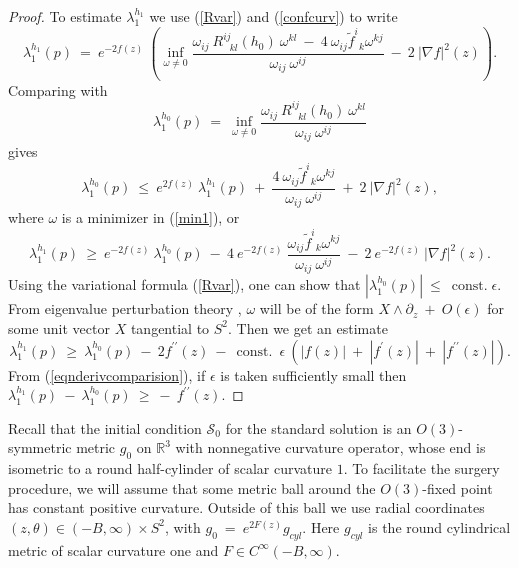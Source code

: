 \documentclass[12pt]{amsart}
\newcommand{\const}{\operatorname{const.}}
\newcommand{\R}{{\mathbb R}}
\newcommand{\s}{{\mathcal S}}
\numberwithin{equation}{section}
\theoremstyle{plain}
\theoremstyle{definition}
\theoremstyle{remark}
\begin{document}
\begin{proof}
To estimate $\lambda_1^{h_1}$ we use
(\ref{Rvar}) and (\ref{confcurv}) to write
\begin{equation} \label{min1}
\lambda_1^{h_1}(p) \: = \: e^{-2f(z)} \: \left(
\inf_{\omega \neq 0} \frac{\omega_{ij} \: R^{ij}_{\: \: \: kl}(h_0) \: \omega^{kl}
\: - \: 4 \: \omega_{ij} \widetilde{f}^i_{\: \: k} \omega^{kj}}{\omega_{ij} \: \omega^{ij}} \: - \: 2 \: |\nabla f|^2(z) \right).
\end{equation}
Comparing with
\begin{equation}
\lambda_1^{h_0}(p) \: = \: 
\inf_{\omega \neq 0} \frac{\omega_{ij} \: R^{ij}_{\: \: \: kl}(h_0) \: \omega^{kl}}{
\omega_{ij} \: \omega^{ij}}
\end{equation}
gives
\begin{equation}
\lambda_1^{h_0}(p) \: \le \: e^{2f(z)} \: \lambda_1^{h_1}(p) \: + \: 
\frac{4 \: \omega_{ij} \widetilde{f}^i_{\: \: k} \omega^{kj}}{\omega_{ij} \: \omega^{ij}} \: + \: 2 \: |\nabla f|^2(z),
\end{equation}
where $\omega$ is a minimizer in (\ref{min1}), or
\begin{equation}
\lambda_1^{h_1}(p) \: \ge \: e^{- 2f(z)} \: \lambda_1^{h_0}(p) \: - \:
4 \: e^{- 2f(z)} \: 
\frac{\omega_{ij} \widetilde{f}^i_{\: \: k} \omega^{kj}}{\omega_{ij} \: \omega^{ij}}
\: - \: 2 \: e^{- 2f(z)} \: |\nabla f|^2(z).
\end{equation}
Using the variational formula (\ref{Rvar}), one can show that
$|\lambda_1^{h_0}(p)| \: \le \: \const \epsilon$.
From eigenvalue perturbation theory
\cite[Chapter 12]{Reed-Simon},
$\omega$ will be of the
form $X \wedge \partial_z \: + \: O(\epsilon)$ for some unit vector $X$ tangential
to $S^2$. Then we get an estimate
\begin{equation}
\lambda_1^{h_1}(p) \: \ge \: \lambda_1^{h_0}(p) \: - \:
2 f^{\prime \prime}(z) \: - \:
\const \: \epsilon \: \left( |f(z)| \: + \: |f^\prime(z)| \: + \:
|f^{\prime \prime}(z)| \right).
\end{equation}
From (\ref{eqnderivcomparision}), if $\epsilon$ is taken sufficiently small
then $\lambda_1^{h_1}(p) \: - \: \lambda_1^{h_0}(p) \: \ge \:  - \:
f^{\prime \prime}(z)$.
\end{proof}

Recall that the initial condition $\s_0$ for the standard solution  is
an $O(3)$-symmetric metric 
$g_0$
 on $\R^3$ with nonnegative curvature operator, whose
end is isometric to a round half-cylinder of scalar curvature $1$.
To facilitate the surgery procedure, we will assume that some metric 
ball around
the $O(3)$-fixed point has constant positive curvature. Outside of
this ball we use radial coordinates 
$(z, \theta) \in (-B,\infty) \times S^2$, with
$g_{0} \: = \: e^{2F(z)} g_{cyl}$. 
Here $g_{cyl}$ is the round cylindrical metric of scalar curvature one
and $F \in  C^\infty(-B,\infty)$.
\end{document}
